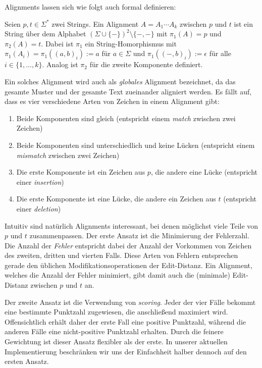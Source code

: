 Alignments lassen sich wie folgt auch formal definieren:

\begin{definition}
\label{def:align:basics:alignment}
Seien $p, t \in \Sigma^*$ zwei Strings. Ein Alignment $A = A_1 \cdots A_k$ zwischen $p$ und $t$ ist ein String über dem Alphabet $\left( \Sigma \cup \{ - \} \right)^2 \setminus \{ -,-\}$ mit $\pi_1(A) = p$ und $\pi_2(A) = t$. Dabei ist $\pi_1$ ein String-Homorphismus mit $\pi_1(A_i) = \pi_1((a,b)_i) := a$ für $a \in \Sigma$ und $\pi_1((-,b)_i) := \epsilon$ für alle $i \in \{1, \ldots, k\}$. Analog ist $\pi_2$ für die zweite Komponente definiert.
\end{definition}

Ein solches Alignment wird auch als \textit{globales} Alignment bezeichnet, da das gesamte Muster und der gesamte Text zueinander aligniert werden. Es fällt auf, dass es vier verschiedene Arten von Zeichen in einem Alignment gibt:

\begin{enumerate}
\item Beide Komponenten sind gleich (entspricht einem \textit{match} zwischen zwei Zeichen)
\item Beide Komponenten sind unterschiedlich und keine Lücken (entspricht einem \textit{mismatch} zwischen zwei Zeichen)
\item Die erste Komponente ist ein Zeichen aus $p$, die andere eine Lücke (entspricht einer \textit{insertion})
\item Die erste Komponente ist eine Lücke, die andere ein Zeichen aus $t$ (entspricht einer \textit{deletion})
\end{enumerate}

Intuitiv sind natürlich Alignments interessant, bei denen möglichst viele Teile von $p$ und $t$ zusammenpassen. Der erste Ansatz ist die Minimierung der Fehlerzahl. Die Anzahl der \textit{Fehler} entspricht dabei der Anzahl der Vorkommen von Zeichen des zweiten, dritten und vierten Falls. Diese Arten von Fehlern entsprechen gerade den üblichen Modifikationsoperationen der Edit-Distanz. Ein Alignment, welches die Anzahl der Fehler minimiert, gibt damit auch die (minimale) Edit-Distanz zwischen $p$ und $t$ an.

Der zweite Ansatz ist die Verwendung von \textit{scoring}. Jeder der vier Fälle bekommt eine bestimmte Punktzahl zugewiesen, die anschließend maximiert wird. Offensichtlich erhält daher der erste Fall eine positive Punktzahl, während die anderen Fälle eine nicht-positive Punktzahl erhalten. Durch die feinere Gewichtung ist dieser Ansatz flexibler als der erste. In unserer aktuellen Implementierung beschränken wir uns der Einfachheit halber dennoch auf den ersten Ansatz.

